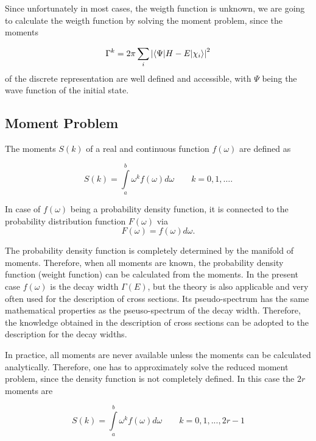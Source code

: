 Since unfortunately in most cases, the weigth function is unknown, we are going
to calculate the weigth function by solving the moment problem, since the moments

\begin{equation}
  \Gamma^k = 2\pi \sum\limits_i \left| \braket{ \Psi | H-E | \chi_i } \right| ^2
\end{equation}
of the discrete representation are well defined and accessible,
with $\Psi$ being the wave function of the initial state.



\subsection{Moment Problem}

The moments $S(k)$ of a real and continuous function $f(\omega)$ are defined
as

\begin{equation}
  S(k) = \int\limits_a^b \omega^k f(\omega) d\omega \quad\quad k=0,1,\dots  .
\end{equation}

In case of $f(\omega)$ being a probability density function, it is connected
to the probability distribution function $F(\omega)$ via
\begin{equation}
  F(\omega) = f(\omega){d\omega} .
\end{equation}

The probability density function is completely determined by the manifold
of moments. Therefore, when all moments are known, the probability density
function  (weight function) can be calculated from the moments.
In the present case $f(\omega)$
is the decay width $\Gamma(E)$, but the theory is also applicable and very often
used for the description of cross sections. Its pseudo-spectrum has the same
mathematical properties as the pseuso-spectrum of the decay width. Therefore,
the knowledge obtained in the description of cross sections can be adopted to
the description for the decay widths.

In practice, all moments are never available unless the moments can be
calculated analytically. Therefore, one has to approximately solve the reduced
moment problem, since the density function is not completely defined.
In this case the $2r$ moments are

\begin{equation}
  S(k) = \int\limits_a^b \omega^k f(\omega) d\omega \quad\quad k=0,1,...,2r-1
\end{equation}

